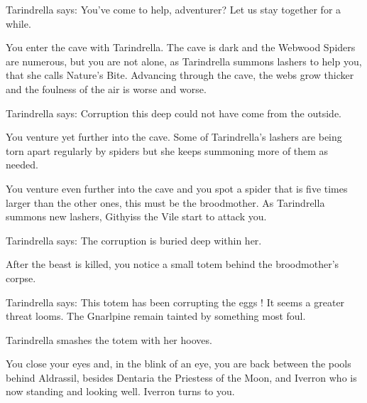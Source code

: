 Tarindrella says: You've come to help, adventurer? Let us stay together for a while.



You enter the cave with Tarindrella. The cave is dark and the Webwood Spiders are numerous, but you are not alone, as Tarindrella summons lashers to help you, that she calls Nature's Bite. Advancing through the cave, the webs grow thicker and the foulness of the air is worse and worse. %

Tarindrella says: Corruption this deep could not have come from the outside.

You venture yet further into the cave. Some of Tarindrella's lashers are being torn apart regularly by spiders but she keeps summoning more of them as needed.



You venture even further into the cave and you spot a spider that is five times larger than the other ones, this must be the broodmother. As Tarindrella summons new lashers, Githyiss the Vile start to attack you.

Tarindrella says: The corruption is buried deep within her.

After the beast is killed, you notice a small totem behind the broodmother's corpse.

Tarindrella says: This totem has been corrupting the eggs ! It seems a greater threat looms. The Gnarlpine remain tainted by something most foul.


Tarindrella smashes the totem with her hooves.


You close your eyes and, in the blink of an eye, you are back between the pools behind Aldrassil, besides Dentaria the Priestess of the Moon, and Iverron who is now standing and looking well. Iverron turns to you.


